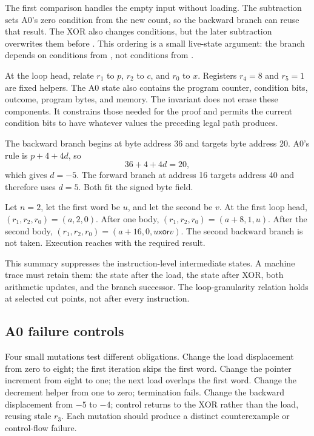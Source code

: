 The first comparison handles the empty input without loading. The subtraction
sets A0's zero condition from the new count, so the backward branch can reuse
that result. The XOR also changes conditions, but the later subtraction
overwrites them before . This ordering is a small live-state
argument: the branch depends on conditions from , not conditions
from .

At the loop head, relate \(r_1\) to \(p\), \(r_2\) to \(c\), and \(r_0\) to
\(x\). Registers \(r_4=8\) and \(r_5=1\) are fixed helpers. The A0 state also
contains the program counter, condition bits, outcome, program bytes, and
memory. The invariant does not erase these components. It constrains those
needed for the proof and permits the current condition bits to have whatever
values the preceding legal path produces.

The backward branch begins at byte address 36 and targets byte address 20.
A0's rule is \(p+4+4d\), so
\[
 36+4+4d=20,
\]
which gives \(d=-5\). The forward branch at address 16 targets address 40 and
therefore uses \(d=5\). Both fit the signed byte field.

\begin{example}[title={A complete two-word A0 trace at loop granularity}]
Let \(n=2\), let the first word be \(u\), and let the second be \(v\). At the
first loop head, \((r_1,r_2,r_0)=(a,2,0)\). After one body,
\((r_1,r_2,r_0)=(a+8,1,u)\). After the second body,
\((r_1,r_2,r_0)=(a+16,0,u\mathbin{\mathsf{xor}}v)\). The second backward
branch is not taken. Execution reaches  with the required result.
\end{example}

This summary suppresses the instruction-level intermediate states. A machine
trace must retain them: the state after the load, the state after XOR, both
arithmetic updates, and the branch successor. The loop-granularity relation
holds at selected cut points, not after every instruction.

\subsection{A0 failure controls}

Four small mutations test different obligations. Change the load displacement
from zero to eight; the first iteration skips the first word. Change the
pointer increment from eight to one; the next load overlaps the first word.
Change the decrement helper from one to zero; termination fails. Change the
backward displacement from \(-5\) to \(-4\); control returns to the XOR rather
than the load, reusing stale \(r_3\). Each mutation should produce a distinct
counterexample or control-flow failure.

